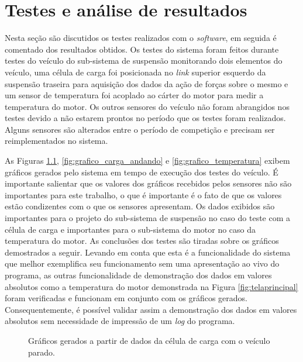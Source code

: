 \chapter{Testes e análise de resultados}
	\label{ch:testes}
Nesta seção são discutidos os testes realizados com o \textit{software}, em seguida é comentado dos resultados obtidos. Os testes do sistema foram feitos durante testes do veículo do sub-sistema de suspensão monitorando dois elementos do veículo, uma célula de carga foi posicionada no \textit{link} superior esquerdo da suspensão traseira para aquisição dos dados da ação de forças sobre o mesmo e um sensor de temperatura foi acoplado ao cárter do motor para medir a temperatura do motor. Os outros sensores do veículo não foram abrangidos nos testes devido a não estarem prontos no período que os testes foram realizados. Alguns sensores são alterados entre o período de competição e precisam ser reimplementados no sistema. 

As Figuras \ref{fig:grafico_carga_parado}, \ref{fig:grafico_carga_andando} e \ref{fig:grafico_temperatura} exibem gráficos gerados pelo sistema em tempo de execução dos testes do veículo. É importante salientar que os valores dos gráficos recebidos pelos sensores não são importantes para este trabalho, o que é importante é o fato de que os valores estão condizentes com o que os sensores apresentam. Os dados exibidos são importantes para o projeto do sub-sistema de suspensão no caso do teste com a célula de carga e importantes para o sub-sistema do motor no caso da temperatura do motor. As conclusões dos testes são tiradas sobre os gráficos demostrados a seguir. Levando em conta que esta é a funcionalidade do sistema que melhor exemplifica seu funcionamento sem uma apresentação ao vivo do programa, as outras funcionalidade de demonstração dos dados em valores absolutos como a temperatura do motor demonstrada na Figura \ref{fig:telaprincipal} foram verificadas e funcionam em conjunto com os gráficos gerados. Consequentemente, é possível validar assim a demonstração dos dados em valores absolutos sem necessidade de impressão de um \textit{log} do programa.

 \begin{figure}[!htb]
	\center
	\caption{Gráficos gerados a partir de dados da célula de carga com o veículo parado.}
	\qquad
	\label{fig:grafico_carga_parado}
\end{figure}
     

